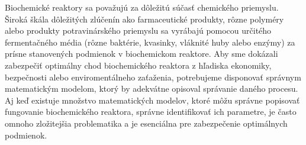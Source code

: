 Biochemické reaktory sa považujú za dôležitú súčasť chemického priemyslu. Široká škála dôležitých zlúčenín ako farmaceutické produkty, rôzne polyméry alebo produkty potravinárského
priemyslu sa vyrábajú pomocou určitého fermentačného média (rôzne baktérie, kvasinky, vláknité huby alebo enzýmy) za prísne stanovených podmienok v biochemickom reaktore. Aby sme dokázali zabezpečiť optimálny chod biochemického reaktora z hľadiska ekonomiky, bezpečnosti alebo enviromentálneho zaťaženia, potrebujeme disponovať správnym matematickým modelom, ktorý by adekvátne opisoval správanie daného procesu. Aj keď existuje množstvo matematických modelov, ktoré môžu správne popisovať fungovanie biochemického reaktora, správne identifikovať ich parametre, je často omnoho zložitejšia problematika a je esenciálna pre zabezpečenie optimálnych podmienok.

